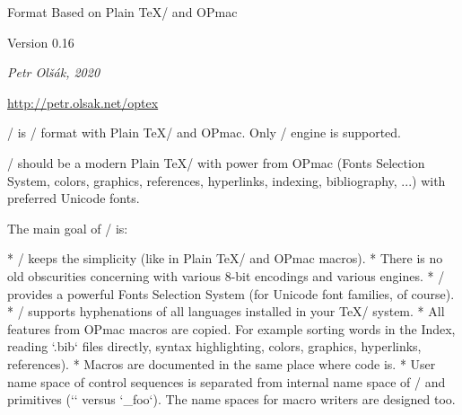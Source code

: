 

  \let\enddocument=\endinput

\typosize[10/12]  %

\begingroup \typosize [11/13.5] %



\centerline{\rm\OpTeX}
\vskip-8mm

\tit Format Based on Plain \TeX/ and OPmac

\hfill Version 0.16

\centerline{\it Petr Olšák, 2020}

\bigskip
\centerline{\url{http://petr.olsak.net/optex}}


\bigskip
\noindent
\OpTeX/ is \LuaTeX/ format with Plain \TeX/ and OPmac. Only \LuaTeX/ engine
is supported. 

\OpTeX/ should be a modern Plain \TeX/ with power from OPmac (Fonts
Selection System, colors, graphics, references, hyperlinks,
indexing, bibliography, ...) with preferred Unicode fonts.

The main goal of \OpTeX/ is:

\begitems
* \OpTeX/ keeps the simplicity (like in Plain \TeX/ and OPmac macros).
* There is no old obscurities concerning with various 8-bit encodings and
  various engines.
* \OpTeX/ provides a powerful Fonts Selection System (for Unicode font
  families, of course).
* \OpTeX/ supports hyphenations of all languages installed in your \TeX/ system.
* All features from OPmac macros are copied. For example sorting words in
  the Index, reading `.bib` files directly, syntax 
  highlighting, colors, graphics, hyperlinks, references).
* Macros are documented in the same place where code is.
* User name space of control sequences is separated from internal name space
  of \OpTeX/ and primitives (`\foo` versus `\_foo`). The name spaces for
  macro writers are designed too.
\enditems

